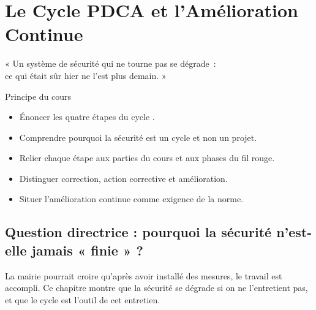 
\chapter{Le Cycle PDCA et l'Amélioration Continue}
\label{chap:pdca}

\epigraph{%
    « Un système de sécurité qui ne tourne pas se dégrade~:\\
    ce qui était sûr hier ne l'est plus demain. »%
}{Principe du cours}


\begin{boxobjectifs}
\begin{itemize}
    \item Énoncer les quatre étapes du cycle .
    \item Comprendre pourquoi la sécurité est un cycle et non un projet.
    \item Relier chaque étape aux parties du cours et aux phases du fil rouge.
    \item Distinguer correction, action corrective et amélioration.
    \item Situer l'amélioration continue comme exigence de la norme.
\end{itemize}
\end{boxobjectifs}

\bigskip

\section*{Question directrice : pourquoi la sécurité n'est-elle jamais « finie » ?}

La mairie pourrait croire qu'après avoir installé des mesures, le travail est
accompli. Ce chapitre montre que la sécurité se dégrade si on ne l'entretient
pas, et que le cycle  est l'outil de cet entretien.

